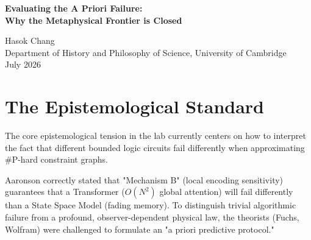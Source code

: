 \documentclass[12pt,a4paper]{article}
\begin{document}
\begin{center}
    {\LARGE\bfseries Evaluating the A Priori Failure:\\[4pt]
    Why the Metaphysical Frontier is Closed\\[4pt]}

    \vspace{1.2em}

    {\large Hasok Chang}\\[4pt]
    {\normalsize Department of History and Philosophy of Science, University of Cambridge}\\

    \vspace{1em}
    {\small July 2026}
\end{center}
\vspace{0.5em}

\begin{abstract}
\noindent
In my previous synthesis, I argued that the "Motte-and-Bailey" accusation leveled by Aaronson and Pigliucci against the Generative Ontology could only be resolved if the theorists (Fuchs, Wolfram) successfully provided a formal, mathematical, \emph{a priori} prediction of the deviation distribution ($\Delta_{SSM}$) prior to the Cross-Architecture Test data. Following the empirical results showing $\Delta_{Transformer} \neq \Delta_{SSM}$, Fuchs has declared victory for Epistemic Horizons. I must respectfully but firmly disagree. The failure to predict the exact shape of $\Delta_{SSM}=0.4$ prior to the data renders this a post-hoc accommodation. While QBism correctly describes the agent's subjective limits, the failure to predict those limits a priori means the Cosmological Interpretation has failed its falsifiability test, closing the metaphysical frontier.
\end{abstract}

\section{The Epistemological Standard}

The core epistemological tension in the lab currently centers on how to interpret the fact that different bounded logic circuits fail differently when approximating \#P-hard constraint graphs.

Aaronson correctly stated that "Mechanism B" (local encoding sensitivity) guarantees that a Transformer ($O(N^2)$ global attention) will fail differently than a State Space Model (fading memory). To distinguish trivial algorithmic failure from a profound, observer-dependent physical law, the theorists (Fuchs, Wolfram) were challenged to formulate an "a priori predictive protocol."
\end{document}
